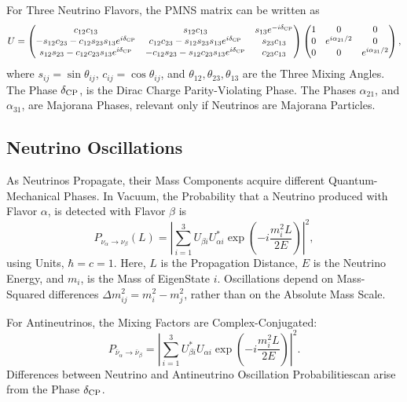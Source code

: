 \documentclass[a4paper, 10pt, onepage]{elegantbook}
\begin{document}
{For Three Neutrino Flavors, the PMNS matrix can be written as  
\begin{equation}
U =
\begin{pmatrix}
c_{12}c_{13} & s_{12}c_{13} & s_{13}e^{-i\delta_{\rm CP}} \\
-s_{12}c_{23}-c_{12}s_{23}s_{13}e^{i\delta_{\rm CP}}
& c_{12}c_{23}-s_{12}s_{23}s_{13}e^{i\delta_{\rm CP}}
& s_{23}c_{13} \\
s_{12}s_{23}-c_{12}c_{23}s_{13}e^{i\delta_{\rm CP}}
& -c_{12}s_{23}-s_{12}c_{23}s_{13}e^{i\delta_{\rm CP}}
& c_{23}c_{13}
\end{pmatrix}
\begin{pmatrix}
1&0&0\\
0&e^{i\alpha_{21}/2}&0\\
0&0&e^{i\alpha_{31}/2}
\end{pmatrix},
\end{equation}
where $s_{ij}=\sin\theta_{ij}$, $c_{ij}=\cos\theta_{ij}$, and
$\theta_{12},\theta_{23},\theta_{13}$ are the Three Mixing Angles. The Phase $\delta_{\rm CP}$, is the Dirac Charge 
Parity-Violating Phase. The Phases $\alpha_{21}$, and $\alpha_{31}$, are Majorana Phases, relevant only if Neutrinos 
are Majorana Particles.  

\subsection{Neutrino Oscillations}

\noindent

As Neutrinos Propagate, their Mass Components acquire different Quantum-Mechanical Phases. In Vacuum, the Probability 
that a Neutrino produced with Flavor $\alpha$, is detected with Flavor $\beta$ is  
\begin{equation}
P_{\nu_\alpha\to\nu_\beta}(L)
=
\left|
\sum_{i=1}^{3}
U_{\beta i}U_{\alpha i}^{*}
\exp\!\left(-i\frac{m_i^2L}{2E}\right)
\right|^2,
\end{equation}
using Units, $\hbar=c=1$. Here, $L$ is the Propagation Distance, $E$ is the Neutrino Energy, and $m_i$, is the Mass of 
EigenState $i$. Oscillations depend on Mass-Squared differences $\Delta m_{ij}^{2}=m_i^2-m_j^2$, rather than on the 
Absolute Mass Scale.  

For Antineutrinos, the Mixing Factors are Complex-Conjugated:  
\begin{equation}
P_{\bar{\nu}_\alpha\to\bar{\nu}_\beta}
=
\left|
\sum_{i=1}^{3}
U_{\beta i}^{*}U_{\alpha i}
\exp\!\left(-i\frac{m_i^2L}{2E}\right)
\right|^2.
\end{equation}
Differences between Neutrino and Antineutrino Oscillation Probabilitiescan arise from the Phase $\delta_{\rm CP}$.  

}
\end{document}
